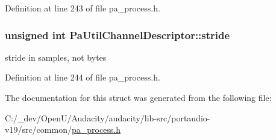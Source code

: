 Definition at line 243 of file pa\+\_\+process.\+h.

\subsubsection[{\texorpdfstring{stride}{stride}}]{\setlength{\rightskip}{0pt plus 5cm}unsigned {\bf int} Pa\+Util\+Channel\+Descriptor\+::stride}\hypertarget{struct_pa_util_channel_descriptor_a9c9ef6ca4556396d20eac3eebb81e27b}{}\label{struct_pa_util_channel_descriptor_a9c9ef6ca4556396d20eac3eebb81e27b}
stride in samples, not bytes 

Definition at line 244 of file pa\+\_\+process.\+h.



The documentation for this struct was generated from the following file\+:\begin{DoxyCompactItemize}
\item 
C\+:/\+\_\+dev/\+Open\+U/\+Audacity/audacity/lib-\/src/portaudio-\/v19/src/common/\hyperlink{pa__process_8h}{pa\+\_\+process.\+h}\end{DoxyCompactItemize}
